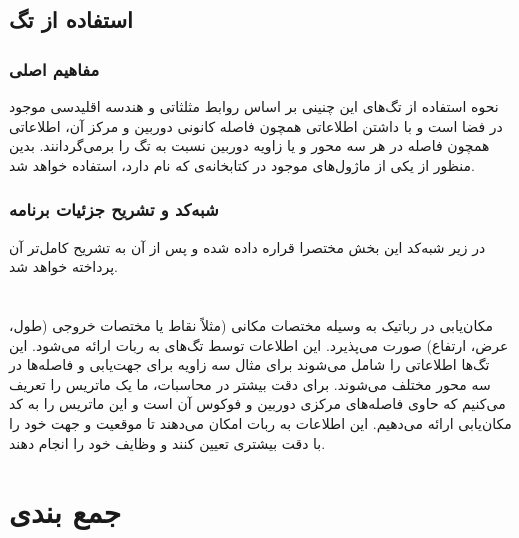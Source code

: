 \newpage
\subsection{استفاده از تگ}
\subsubsection{مفاهیم اصلی}
نحوه استفاده از تگ‌های این چنینی بر اساس روابط مثلثاتی و هندسه اقلیدسی موجود در فضا است و با داشتن اطلاعاتی همچون فاصله کانونی دوربین و مرکز آن، اطلاعاتی همچون فاصله در هر سه محور و یا زاویه دوربین نسبت به تگ را برمی‌گردانند.
بدین منظور از یکی از ماژول‌های موجود در کتابخانه‌ی
که
نام دارد، استفاده خواهد شد. 
\subsubsection{شبه‌کد و تشریح جزئیات برنامه}

در زیر شبه‌کد این بخش مختصرا قراره داده شده و پس از آن به تشریح کامل‌تر آن پرداخته خواهد شد.
\section*{}
\begin{latin}
	
\end{latin}

مکان‌یابی در رباتیک به وسیله مختصات مکانی (مثلاً نقاط
یا مختصات خروجی (طول، عرض، ارتفاع) صورت می‌پذیرد. این اطلاعات توسط تگ‌های
به ربات ارائه می‌شود. این تگ‌ها اطلاعاتی را شامل می‌شوند برای مثال سه زاویه
برای جهت‌یابی و فاصله‌ها در سه محور مختلف می‌شوند. برای دقت بیشتر در محاسبات، ما یک ماتریس را تعریف می‌کنیم که حاوی فاصله‌های مرکزی دوربین و فوکوس آن است و این ماتریس را به کد مکان‌یابی ارائه می‌دهیم. این اطلاعات به ربات امکان می‌دهند تا موقعیت و جهت خود را با دقت بیشتری تعیین کنند و وظایف خود را انجام دهند.
\section*{}
\begin{latin}
	
\end{latin}



\section{جمع بندی}

